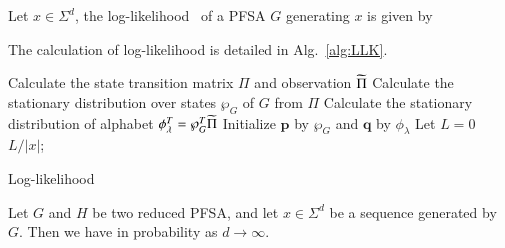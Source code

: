 \begin{defn}
Let $x\in\Sigma^{d}$, the log-likelihood~\cite{cover2012elements} of a PFSA $G$ generating $x$ is given by
\end{defn}
The calculation of log-likelihood is detailed in Alg.~\ref{alg:LLK}.
\begin{algorithm}[!ht]

	Calculate the state transition matrix $\Pi$ and observation $\widetilde{\Pi}$\; 
	Calculate the stationary distribution over states $\wp_{G}$ of $G$ from $\Pi$\;
	Calculate the stationary distribution of alphabet $\phi_{\lambda}^{T} = \wp_{G}^{T}\widetilde{\Pi}$\;
	Initialize $\mathbf{p}$ by $\wp_{G}$ and $\mathbf{q}$ by $\phi_{\lambda}$\;
	Let $L = 0$\;
    \Return $L / |x|$;
    \caption{Log-likelihood}
    \label{alg:LLK}
\end{algorithm}

\begin{thm}
\label{thm:convergenceOfLLH}
Let $G$ and $H$ be two reduced PFSA, and let $x\in\Sigma^d$ be a sequence generated by $G$. Then we have
in probability as $d\rightarrow\infty$.
\end{thm}


